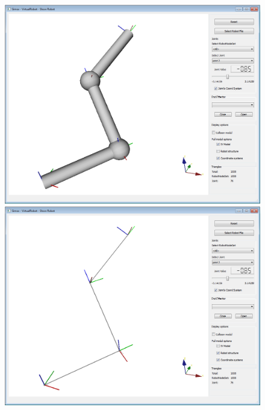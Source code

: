 \begin{figure}[H]
	\centering
	\begin{minipage} {.45\linewidth}
	  \includegraphics[width=\linewidth]{Tutorial4a}
	\end{minipage}
	\begin{minipage} {.45\linewidth}
	  \includegraphics[width=\linewidth]{Tutorial4b}
	\end{minipage}
\end{figure}
\par
